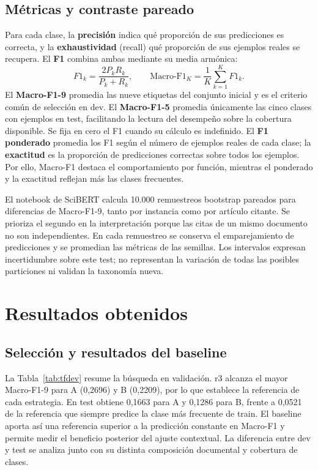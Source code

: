 \documentclass[10pt,a4paper,twocolumn]{article}
\begin{document}
\subsection{Métricas y contraste pareado}
Para cada clase, la \textbf{precisión} indica qué proporción de sus predicciones es correcta, y la \textbf{exhaustividad} (recall) qué proporción de sus ejemplos reales se recupera. El \textbf{F1} combina ambas mediante su media armónica:
\[
 F1_k=\frac{2P_kR_k}{P_k+R_k},\qquad
 \mathrm{Macro\text{-}F1}_{K}=\frac{1}{K}\sum_{k=1}^{K}F1_k.
\]
El \textbf{Macro-F1-9} promedia las nueve etiquetas del conjunto inicial y es el criterio común de selección en dev. El \textbf{Macro-F1-5} promedia únicamente las cinco clases con ejemplos en test, facilitando la lectura del desempeño sobre la cobertura disponible. Se fija en cero el F1 cuando su cálculo es indefinido. El \textbf{F1 ponderado} promedia los F1 según el número de ejemplos reales de cada clase; la \textbf{exactitud} es la proporción de predicciones correctas sobre todos los ejemplos. Por ello, Macro-F1 destaca el comportamiento por función, mientras el ponderado y la exactitud reflejan más las clases frecuentes.

El notebook de SciBERT calcula 10.000 remuestreos bootstrap pareados para diferencias de Macro-F1-9, tanto por instancia como por artículo citante. Se prioriza el segundo en la interpretación porque las citas de un mismo documento no son independientes. En cada remuestreo se conserva el emparejamiento de predicciones y se promedian las métricas de las semillas. Los intervalos expresan incertidumbre sobre este test; no representan la variación de todas las posibles particiones ni validan la taxonomía nueva.

\section{Resultados obtenidos}
\subsection{Selección y resultados del baseline}
La Tabla~\ref{tab:tfdev} resume la búsqueda en validación. r3 alcanza el mayor Macro-F1-9 para A (0,2696) y B (0,2209), por lo que establece la referencia de cada estrategia. En test obtiene 0,1663 para A y 0,1286 para B, frente a 0,0521 de la referencia que siempre predice la clase más frecuente de train. El baseline aporta así una referencia superior a la predicción constante en Macro-F1 y permite medir el beneficio posterior del ajuste contextual. La diferencia entre dev y test se analiza junto con su distinta composición documental y cobertura de clases.
\end{document}
